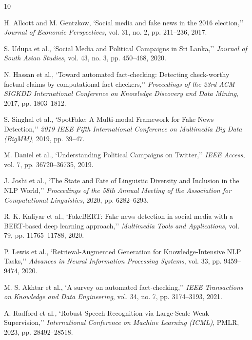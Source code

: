 \documentclass[12pt,a4paper]{report}
\begin{document}
\renewcommand{\bibname}{References}
\begin{thebibliography}{10}

H. Allcott and M. Gentzkow, `Social media and fake news in the 2016 election,'' \textit{Journal of Economic Perspectives}, vol. 31, no. 2, pp. 211--236, 2017.

S. Udupa et al., `Social Media and Political Campaigns in Sri Lanka,'' \textit{Journal of South Asian Studies}, vol. 43, no. 3, pp. 450--468, 2020.

N. Hassan et al., `Toward automated fact-checking: Detecting check-worthy factual claims by computational fact-checkers,'' \textit{Proceedings of the 23rd ACM SIGKDD International Conference on Knowledge Discovery and Data Mining}, 2017, pp. 1803--1812.

S. Singhal et al., `SpotFake: A Multi-modal Framework for Fake News Detection,'' \textit{2019 IEEE Fifth International Conference on Multimedia Big Data (BigMM)}, 2019, pp. 39--47.

M. Daniel et al., `Understanding Political Campaigns on Twitter,'' \textit{IEEE Access}, vol. 7, pp. 36720--36735, 2019.

J. Joshi et al., `The State and Fate of Linguistic Diversity and Inclusion in the NLP World,'' \textit{Proceedings of the 58th Annual Meeting of the Association for Computational Linguistics}, 2020, pp. 6282--6293.

R. K. Kaliyar et al., `FakeBERT: Fake news detection in social media with a BERT-based deep learning approach,'' \textit{Multimedia Tools and Applications}, vol. 79, pp. 11765--11788, 2020.

P. Lewis et al., `Retrieval-Augmented Generation for Knowledge-Intensive NLP Tasks,'' \textit{Advances in Neural Information Processing Systems}, vol. 33, pp. 9459--9474, 2020.

M. S. Akhtar et al., `A survey on automated fact-checking,'' \textit{IEEE Transactions on Knowledge and Data Engineering}, vol. 34, no. 7, pp. 3174--3193, 2021.

A. Radford et al., `Robust Speech Recognition via Large-Scale Weak Supervision,'' \textit{International Conference on Machine Learning (ICML)}, PMLR, 2023, pp. 28492--28518.

\end{thebibliography}
\end{document}
